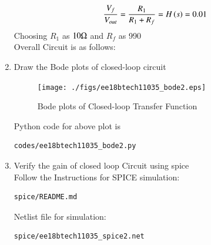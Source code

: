 \begin{enumerate}[label=\thesubsection.\arabic*.,ref=\thesubsection.\theenumi]
\begin{align}
    \frac{V_{f}}{V_{out}}=\frac{R_{1}}{R_{1}+R_{f}}=H\left(s\right)=0.01
\end{align}
Choosing $R_{1}$ as $10\ohm$ and $R_{f}$ as 990\ohm\\

Overall Circuit is as follows:
\begin{figure}[!ht]
    \begin{center}
		\resizebox{\columnwidth}{!}{}
	\end{center}
\caption{}
\label{fig:ee18btech11035_circuit}
\end{figure}


\begin{table}[!ht]
\centering

\caption{}
\label{table:ee18btech11035_table1}
\end{table}


\item Draw the Bode plots of closed-loop circuit\\
\solution
\begin{figure}[!h]
  \texttt{[image: ./figs/ee18btech11035\_bode2.eps]}
  \caption{Bode plots of Closed-loop Transfer Function}
  \label{fig:ee18btech11035_bode2}
\end{figure}

Python code for above plot is
\begin{lstlisting}
codes/ee18btech11035_bode2.py
\end{lstlisting}



\item Verify the gain of closed loop Circuit using spice\\
\solution Follow the Instructions for SPICE simulation:
\begin{lstlisting}
spice/README.md
\end{lstlisting}
Netlist file for simulation:
\begin{lstlisting}
spice/ee18btech11035_spice2.net
\end{lstlisting}


\end{enumerate}
